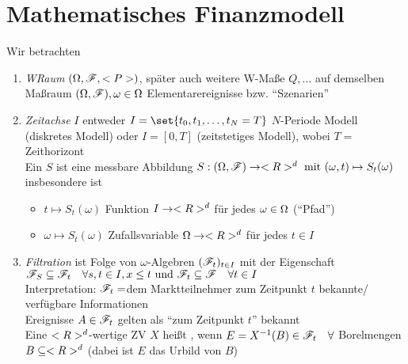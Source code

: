 \section{Mathematisches Finanzmodell}
Wir betrachten
\begin{enumerate}
	\item \emph{WRaum} $(\Omega,\mathscr F,<P>)$, später auch weitere W-Maße $Q, \dots$ auf demselben Maßraum $(\Omega,\mathscr F), \omega \in \Omega$ Elementarereignisse bzw. ``Szenarien''
	\item \emph{Zeitachse} $I$ entweder $I=\set{t_0, t_1, \dots, t_N=T}$ $N$-Periode Modell (diskretes Modell) oder $I = [0,T]$ (zeitstetiges Modell), wobei $T = $ Zeithorizont\\
	Ein  $S$ ist eine messbare Abbildung $S: (\Omega,\mathscr F) \to <R>^d \text{ mit } (\omega, t) \mapsto S_t(\omega)$\\
	insbesondere ist 
	\begin{itemize}
		\item $t \mapsto S_t(\omega)$ Funktion $I \to <R>^d$ für jedes $\omega \in \Omega$ (``Pfad'')
		\item $\omega \mapsto S_t(\omega)$ Zufallsvariable $\Omega \to <R>^d$ für jedes $t \in I$
	\end{itemize}
	\item \emph{Filtration} ist Folge von $\omega$-Algebren $(\mathscr F_t)_{t \in I}$ mit der Eigenschaft $\mathscr F_S \subseteq \mathscr F_t \quad \forall s,t \in I, x \le t \text{ und } \mathscr F_t \subseteq \mathscr F\quad \forall t \in I$\\
	Interpretation: $\mathscr F_t=$dem Marktteilnehmer zum Zeitpunkt $t$ bekannte/ verfügbare Informationen\\
	Ereignisse $A \in \mathscr F_t$ gelten als ``zum Zeitpunkt $t$'' bekannt\\
	Eine $<R>^d$-wertige ZV $X$ heißt , wenn $E = X^{-1}(B) \in \mathscr F_t \quad \forall$ Borelmengen $B \subseteq <R>^d$ (dabei ist $E$ das Urbild von $B$)


\end{enumerate}
